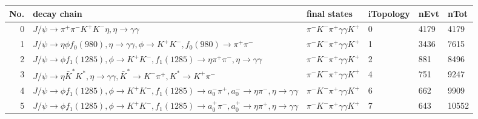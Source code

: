 \begin{table}[htbp] 
\begin{center}
\begin{small}
\begin{tabular}{rlllll}\hline\hline
 No. & decay chain & final states &  iTopology & nEvt & nTot \\\hline
  0&$J/\psi       \rightarrow \pi^{+}        \pi^{-}        K^{+}          K^{-}          \eta          , \eta           \rightarrow \gamma       \gamma       $&$\pi^{-}        K^{-}          \pi^{+}        \gamma       \gamma       K^{+}          $&    0& 4179& 4179\\
  1&$J/\psi       \rightarrow \eta          \phi           f_{0}(980)     , \eta           \rightarrow \gamma       \gamma       , \phi            \rightarrow K^{+}          K^{-}          , f_{0}(980)      \rightarrow \pi^{+}        \pi^{-}        $&$\pi^{-}        K^{-}          \pi^{+}        \gamma       \gamma       K^{+}          $&    1& 3436& 7615\\
  2&$J/\psi       \rightarrow \phi           f_{1}(1285)    , \phi            \rightarrow K^{+}          K^{-}          , f_{1}(1285)     \rightarrow \eta          \pi^{+}        \pi^{-}        , \eta           \rightarrow \gamma       \gamma       $&$\pi^{-}        K^{-}          \pi^{+}        \gamma       \gamma       K^{+}          $&    2&  881& 8496\\
  3&$J/\psi       \rightarrow \eta          \bar{K}^{*}   K^{*}          , \eta           \rightarrow \gamma       \gamma       , \bar{K}^{*}    \rightarrow K^{-}          \pi^{+}        , K^{*}           \rightarrow K^{+}          \pi^{-}        $&$\pi^{-}        K^{-}          \pi^{+}        \gamma       \gamma       K^{+}          $&    4&  751& 9247\\
  4&$J/\psi       \rightarrow \phi           f_{1}(1285)    , \phi            \rightarrow K^{+}          K^{-}          , f_{1}(1285)     \rightarrow a_{0}^{-}      \pi^{+}        , a_{0}^{-}       \rightarrow \eta          \pi^{-}        , \eta           \rightarrow \gamma       \gamma       $&$\pi^{-}        K^{-}          \pi^{+}        \gamma       \gamma       K^{+}          $&    6&  662& 9909\\
  5&$J/\psi       \rightarrow \phi           f_{1}(1285)    , \phi            \rightarrow K^{+}          K^{-}          , f_{1}(1285)     \rightarrow a_{0}^{+}      \pi^{-}        , a_{0}^{+}       \rightarrow \eta          \pi^{+}        , \eta           \rightarrow \gamma       \gamma       $&$\pi^{-}        K^{-}          \pi^{+}        \gamma       \gamma       K^{+}          $&    7&  643&10552\\

\end{tabular}
\end{small}
\end{center}
\end{table}
